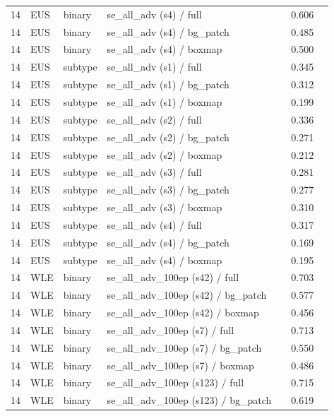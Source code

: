 \begin{longtable}{cL{1.1cm}L{1.5cm}L{5.6cm}ccc}
14 & EUS & binary & se\_all\_adv (s4) / full & \nl{} & 0.606 & \nl{} \\
14 & EUS & binary & se\_all\_adv (s4) / bg\_patch & \nl{} & 0.485 & \nl{} \\
14 & EUS & binary & se\_all\_adv (s4) / boxmap & \nl{} & 0.500 & \nl{} \\
14 & EUS & subtype & se\_all\_adv (s1) / full & \nl{} & 0.345 & \nl{} \\
14 & EUS & subtype & se\_all\_adv (s1) / bg\_patch & \nl{} & 0.312 & \nl{} \\
14 & EUS & subtype & se\_all\_adv (s1) / boxmap & \nl{} & 0.199 & \nl{} \\
14 & EUS & subtype & se\_all\_adv (s2) / full & \nl{} & 0.336 & \nl{} \\
14 & EUS & subtype & se\_all\_adv (s2) / bg\_patch & \nl{} & 0.271 & \nl{} \\
14 & EUS & subtype & se\_all\_adv (s2) / boxmap & \nl{} & 0.212 & \nl{} \\
14 & EUS & subtype & se\_all\_adv (s3) / full & \nl{} & 0.281 & \nl{} \\
14 & EUS & subtype & se\_all\_adv (s3) / bg\_patch & \nl{} & 0.277 & \nl{} \\
14 & EUS & subtype & se\_all\_adv (s3) / boxmap & \nl{} & 0.310 & \nl{} \\
14 & EUS & subtype & se\_all\_adv (s4) / full & \nl{} & 0.317 & \nl{} \\
14 & EUS & subtype & se\_all\_adv (s4) / bg\_patch & \nl{} & 0.169 & \nl{} \\
14 & EUS & subtype & se\_all\_adv (s4) / boxmap & \nl{} & 0.195 & \nl{} \\
14 & WLE & binary & se\_all\_adv\_100ep (s42) / full & \nl{} & 0.703 & \nl{} \\
14 & WLE & binary & se\_all\_adv\_100ep (s42) / bg\_patch & \nl{} & 0.577 & \nl{} \\
14 & WLE & binary & se\_all\_adv\_100ep (s42) / boxmap & \nl{} & 0.456 & \nl{} \\
14 & WLE & binary & se\_all\_adv\_100ep (s7) / full & \nl{} & 0.713 & \nl{} \\
14 & WLE & binary & se\_all\_adv\_100ep (s7) / bg\_patch & \nl{} & 0.550 & \nl{} \\
14 & WLE & binary & se\_all\_adv\_100ep (s7) / boxmap & \nl{} & 0.486 & \nl{} \\
14 & WLE & binary & se\_all\_adv\_100ep (s123) / full & \nl{} & 0.715 & \nl{} \\
14 & WLE & binary & se\_all\_adv\_100ep (s123) / bg\_patch & \nl{} & 0.619 & \nl{} \\

\end{longtable}

